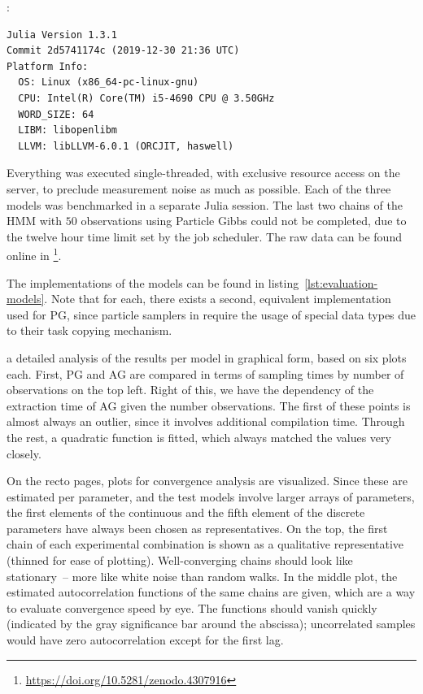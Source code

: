 :
\begin{lstlisting}
Julia Version 1.3.1
Commit 2d5741174c (2019-12-30 21:36 UTC)
Platform Info:
  OS: Linux (x86_64-pc-linux-gnu)
  CPU: Intel(R) Core(TM) i5-4690 CPU @ 3.50GHz
  WORD_SIZE: 64
  LIBM: libopenlibm
  LLVM: libLLVM-6.0.1 (ORCJIT, haswell)
\end{lstlisting}
Everything was executed single-threaded, with exclusive resource access on the server, to preclude
measurement noise as much as possible.  Each of the three models was benchmarked in a separate Julia
session.  The last two chains of the HMM with \(50\) observations using Particle Gibbs could not be
completed, due to the twelve hour time limit set by the job scheduler.  The raw data can be found
online in \textcite{gabler2020mcmc}\footnote{\protect\url{https://doi.org/10.5281/zenodo.4307916}}.

The \dppljl{} implementations of the models can be found in listing~\ref{lst:evaluation-models}.
Note that for each, there exists a second, equivalent implementation used for PG, since particle
samplers in \turingjl{} require the usage of special data types due to their task copying mechanism.

 a detailed analysis of the results per model in graphical form, based on six
plots each.  First, PG and AG are compared in terms of sampling times by number of observations on
the top left.  Right of this, we have the dependency of the extraction time of AG given the number
observations.  The first of these points is almost always an outlier, since it involves additional
compilation time.  Through the rest, a quadratic function is fitted, which always matched the values
very closely.

On the recto pages, plots for convergence analysis are visualized.  Since these are estimated per
parameter, and the test models involve larger arrays of parameters, the first elements of the
continuous and the fifth element of the discrete parameters have always been chosen as
representatives.  On the top, the first chain of each experimental combination is shown as a
qualitative representative (thinned for ease of plotting).  Well-converging chains should look like
stationary~-- more like white noise than random walks.  In the middle plot, the estimated
autocorrelation functions of the same chains are given, which are a way to evaluate convergence
speed by eye.  The functions should vanish quickly (indicated by the gray significance bar around
the abscissa); uncorrelated samples would have zero autocorrelation except for the first lag.

